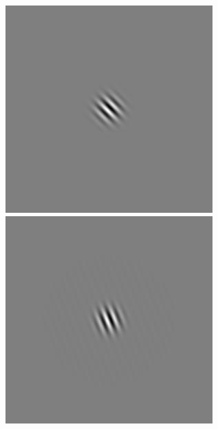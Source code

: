 \begin{figure}[ht]
\begin{center}
 \includegraphics[width=\columnwidth/9]{ch4/figures/rGabor2_6.jpg}
 \includegraphics[width=\columnwidth/9]{ch4/figures/rGabor2_7.jpg}\\

\end{center}
\end{figure}
